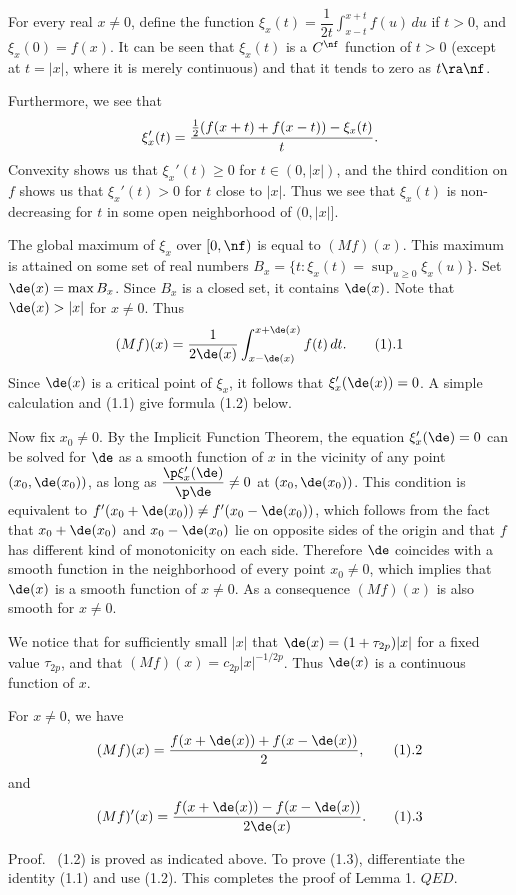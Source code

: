 For every real $x\ne0$, define the function $\xi_x(t)=
\dfrac{1}{2t} \displaystyle\int_{x-t}^{x+t}f(u)\, du$ if $t>0$, and
$\xi_x(0) = f(x)$. It can be
seen that $\xi_x(t)$ is a $C^\nf$ function of $t> 0$
(except at $t = |x|$, where it is merely continuous)
and that it tends to zero
as $t\ra \nf$. 

Furthermore, we see that 
$$ \xi_x'(t) = {{1\over2}(f(x+t)+f(x-t)) - \xi_x(t) \over t} .$$
Convexity shows us that $\xi_x'(t) \ge 0$ for $t \in (0,|x|)$, and
the third condition on $f$ shows us that $\xi_x'(t) > 0$ for $t$ close
to $|x|$.  Thus we see that
$\xi_x(t)$ is non-decreasing for $t$ in some open neighborhood
of $(0, |x|]$.

The global maximum of $\xi_x$ over $[0,\nf)$ is
equal to $(Mf)(x)$. This maximum
is attained on some  set of  real numbers  $B_x=\{ t: \xi_x(t) =
\sup_{u\ge 0}\xi_x(u)\}$. Set $\de(x)= \max B_x$. Since $B_x$ is
a closed set, it contains $\de(x)$.  Note that $\de(x) > |x|$ for
$x\ne0$.
Thus
$$
(Mf)(x)= {1 \over 2 \de(x) }\int_{x-\de(x)}^{x+\de(x)}
f(t) \, dt.\tag1.1
$$
Since $\de(x)$ is a critical point of $\xi_x$, it follows that
$\xi_x'(\de(x))=0$. A simple calculation  and (1.1)
give formula (1.2) below.

Now fix $x_0 \ne 0$.
By the Implicit Function Theorem, the equation
$\xi_x'(\de)=0$ can be solved for $\de$ as a smooth
function of $x$ in the vicinity of any point $(x_0,\de(x_0))$,
as long as $\dfrac{ \p   \xi_x'(\de)}{ \p \de} \neq 0$ at $(x_0,\de(x_0))$.
This condition is equivalent to
$f'(x_0+\de(x_0))\neq f'(x_0-\de(x_0))$, which follows from the fact
that  $x_0+\de(x_0)$ and $x_0-\de(x_0)$ lie on opposite sides of
the origin and that
$f$ has different kind of monotonicity on each side.
Therefore $\de$ coincides with a smooth function in the
neighborhood of every point $x_0 \ne 0$, which implies that
$\de(x)$ is a smooth function of $x \ne 0$.
As a consequence $(Mf)(x)$ is also smooth for $x \ne 0$.

We notice that for sufficiently small $|x|$ that
$\de(x) = (1+\tau_{2p}) |x|$ for a fixed value $\tau_{2p}$, and
that $(Mf)(x) = c_{2p} |x|^{-1/2p}$.
Thus $\de(x)$ is a continuous function of $x$.

 For $x\ne 0$, we have
$$
 (Mf)(x)= {f(x+\de(x))+f(x-\de(x))\over 2},\tag1.2
 $$
 and
 $$
(Mf)'(x)= {f(x+\de(x))-f(x-\de(x))\over 2\de(x)}.\tag1.3
$$

\endproclaim

{\smc Proof.} $\,$ (1.2) is proved as indicated above.
To prove (1.3), differentiate the identity (1.1) and use (1.2).
This completes the proof of Lemma 1. $QED$.


